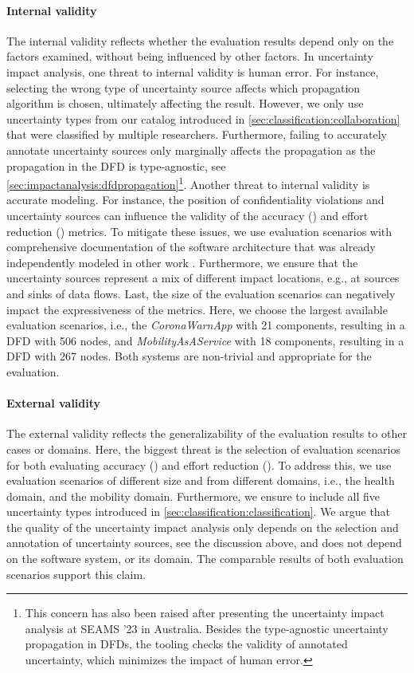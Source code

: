 \paragraph*{Internal validity}
The internal validity reflects whether the evaluation results depend only on the factors examined, without being influenced by other factors.
In uncertainty impact analysis, one threat to internal validity is human error.
For instance, selecting the wrong type of uncertainty source affects which propagation algorithm is chosen, ultimately affecting the result.
However, we only use uncertainty types from our catalog introduced in \autoref{sec:classification:collaboration} that were classified by multiple researchers.
Furthermore, failing to accurately annotate uncertainty sources only marginally affects the propagation as the propagation in the \ac{DFD} is type-agnostic, see \autoref{sec:impactanalysis:dfdpropagation}\footnote{This concern has also been raised after presenting the uncertainty impact analysis at SEAMS '23 in Australia. Besides the type-agnostic uncertainty propagation in \acp{DFD}, the tooling \uia checks the validity of annotated uncertainty, which minimizes the impact of human error.}.
Another threat to internal validity is accurate modeling.
For instance, the position of confidentiality violations and uncertainty sources can influence the validity of the accuracy () and effort reduction () metrics.
To mitigate these issues, we use evaluation scenarios with comprehensive documentation of the software architecture that was already independently modeled in other work \cite{benkler_architecture-based_2022,boltz_extensible_2024}.
Furthermore, we ensure that the uncertainty sources represent a mix of different impact locations, e.g., at sources and sinks of data flows.
Last, the size of the evaluation scenarios can negatively impact the expressiveness of the metrics.
Here, we choose the largest available evaluation scenarios, i.e., the \emph{CoronaWarnApp} with 21 components, resulting in a \ac{DFD} with 506 nodes, and \emph{MobilityAsAService} with 18 components, resulting in a \ac{DFD} with 267 nodes.
Both systems are non-trivial and appropriate for the evaluation.


\paragraph*{External validity}
The external validity reflects the generalizability of the evaluation results to other cases or domains.
Here, the biggest threat is the selection of evaluation scenarios for both evaluating accuracy () and effort reduction ().
To address this, we use evaluation scenarios of different size and from different domains, i.e., the health domain, and the mobility domain.
Furthermore, we ensure to include all five uncertainty types introduced in \autoref{sec:classification:classification}.
We argue that the quality of the uncertainty impact analysis only depends on the selection and annotation of uncertainty sources, see the discussion above, and does not depend on the software system, or its domain.
The comparable results of both evaluation scenarios support this claim.


